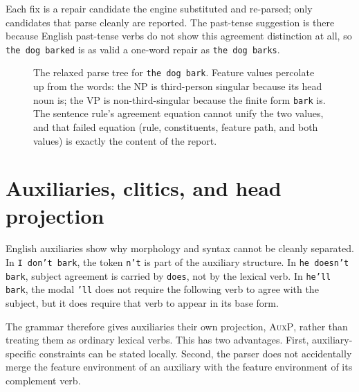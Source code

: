 \documentclass[11pt]{article}
\theoremstyle{definition}
\theoremstyle{plain}
\theoremstyle{remark}
\begin{document}
Each fix is a repair candidate the engine substituted and re-parsed; only
candidates that parse cleanly are reported. The past-tense suggestion is there
because English past-tense verbs do not show this agreement distinction at all,
so \texttt{the dog barked} is as valid a one-word repair as \texttt{the dog
barks}.

\begin{figure}[H]
\centering
{}
\caption{The relaxed parse tree for \texttt{the dog bark}. Feature values
percolate up from the words: the NP is third-person singular because its head
noun is; the VP is non-third-singular because the finite form \texttt{bark} is.
The sentence rule's agreement equation cannot unify the two values, and that
failed equation (rule, constituents, feature path, and both values) is
exactly the content of the report.}
\label{fig:parse-tree}
\end{figure}

\section{Auxiliaries, clitics, and head projection}

English auxiliaries show why morphology and syntax cannot be cleanly separated.
In \texttt{I don't bark}, the token \texttt{n't} is part of the auxiliary structure.
In \texttt{he doesn't bark}, subject agreement is
carried by \texttt{does}, not by the lexical verb. In \texttt{he'll bark}, the
modal \texttt{'ll} does not require the following verb to agree with the subject,
but it does require that verb to appear in its base form.

The grammar therefore gives auxiliaries their own projection, \textsc{AuxP},
rather than treating them as ordinary lexical verbs. This has two advantages.
First, auxiliary-specific constraints can be stated locally. Second, the parser
does not accidentally merge the feature environment of an auxiliary with the
feature environment of its complement verb.
\end{document}
